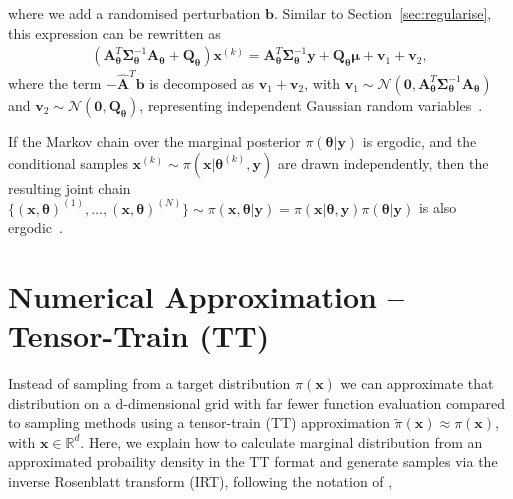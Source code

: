 where we add a randomised perturbation $\bm{b}$.
Similar to Section~\ref{sec:regularise}, this expression can be rewritten as
\begin{align}
	\label{eq:RTO}
	\left( \bm{A}_{\bm{\theta}}^T \bm{\Sigma}^{-1}_{\bm{\theta}} \bm{A}_{\bm{\theta}} + \bm{Q}_{\bm{\theta}} \right) \bm{x}^{(k)} = \bm{A}_{\bm{\theta}}^T \bm{\Sigma}^{-1}_{\bm{\theta}} \bm{y} + \bm{Q}_{\bm{\theta}} \bm{\mu} + \bm{v}_1 + \bm{v}_2,
\end{align}
where the term $-\hat{\bm{A}}^T \bm{b}$ is decomposed as $\bm{v}_1 + \bm{v}_2$, with $\bm{v}_1 \sim \mathcal{N}(\bm{0}, \bm{A}_{\bm{\theta}}^T \bm{\Sigma}^{-1}_{\bm{\theta}} \bm{A}_{\bm{\theta}})$ and $\bm{v}_2 \sim \mathcal{N}(\bm{0}, \bm{Q}_{\bm{\theta}})$, representing independent Gaussian random variables~\cite{bardsley2012mcmc, fox2016fast}.

If the Markov chain over the marginal posterior $\pi(\bm{\theta} |  \bm{y})$ is ergodic, and the conditional samples $\bm{x}^{(k)} \sim \pi(\bm{x}|   \bm{\theta}^{(k)}, \bm{y})$ are drawn independently, then the resulting joint chain $\{ (\bm{x}, \bm{\theta})^{(1)}, \dots, (\bm{x}, \bm{\theta})^{(N)} \} \sim \pi(\bm{x}, \bm{\theta} |  \bm{y}) =  \pi(\bm{x} |  \bm{\theta} , \bm{y}) \pi( \bm{\theta} | \bm{y})$ is also ergodic~\cite{acosta2022markov}.

\section{Numerical Approximation -- Tensor-Train (TT)}
\label{sec:tensortrain}
Instead of sampling from a target distribution $\pi(\bm{x})$ we can approximate that distribution on a d-dimensional grid with far fewer function evaluation compared to sampling methods using a tensor-train (TT) approximation $\tilde{\pi}(\bm{x}) \approx \pi(\bm{x})$, with  $\bm{x}\in \mathbb{R}^d$.
Here, we explain how to calculate marginal distribution from an approximated probaility density in the TT format and generate samples via the inverse Rosenblatt transform (IRT), following the notation of \cite{cui2022deep},

